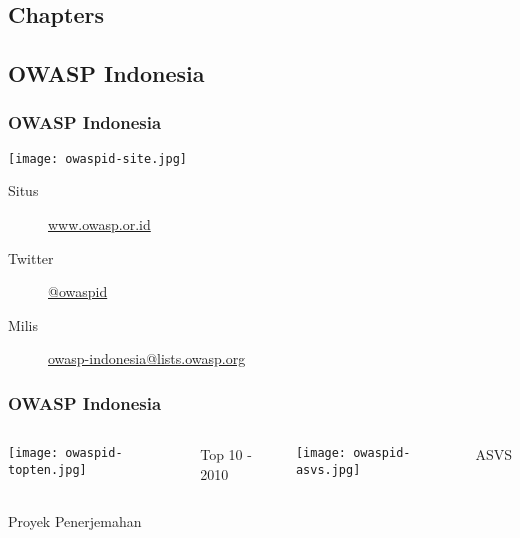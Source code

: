 \documentclass[xcolor=pdftex,table,handouts]{beamer}
\begin{document}

\subsection{Chapters}


\subsection{OWASP Indonesia}

\begin{frame}
	\frametitle{OWASP Indonesia}
	\begin{center}
		\texttt{[image: owaspid-site.jpg]}			
	\end{center}
	\begin{description}
		\item[Situs] {\href{http://www.owasp.or.id}{www.owasp.or.id}}
		\item[Twitter] {\href{http://twitter.com/owaspid}{@owaspid}} \\ 
		\item[Milis] {\href{https://lists.owasp.org/mailman/listinfo/owasp-indonesia}{owasp-indonesia@lists.owasp.org}}
	\end{description}
\end{frame}

\begin{frame}
	\frametitle{OWASP Indonesia}
	\begin{center}	
	\begin{columns}			
			\texttt{[image: owaspid-topten.jpg]}
			\\ \begin{center}
					Top 10 - 2010
				\end{center} 		
			\texttt{[image: owaspid-asvs.jpg]}
			\\ \begin{center}
					ASVS
				\end{center}
	\end{columns}
	\vskip1cm Proyek Penerjemahan
	\end{center}
\end{frame}
\end{document}
